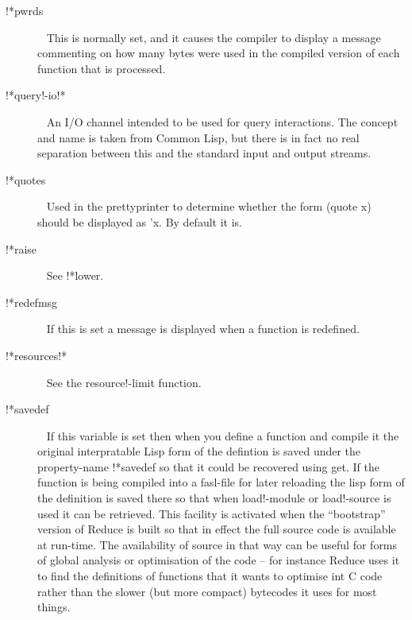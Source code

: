 \documentclass[a4paper,11pt]{article}
\begin{document}
\begin{description}
\item [{\ttfamily !*pwrds}]  ~\newline
This is normally set, and it causes the compiler to display a message
commenting on how many bytes were used in the compiled version of each
function that is processed.

\item [{\ttfamily !*query!-io!*}]  ~\newline
An I/O channel intended to be used for query interactions. The concept
and name is taken from Common Lisp, but there is in fact no real separation
between this and the standard input and output streams.

\item [{\ttfamily !*quotes}]  ~\newline
Used in the prettyprinter to determine whether the form {\ttfamily (quote x)}
should be displayed as {\ttfamily 'x}. By default it is.

\item [{\ttfamily !*raise}]  ~\newline
See {\ttfamily !*lower}.

\item [{\ttfamily !*redefmsg}]  ~\newline
If this is set a message is displayed when a function is redefined.

\item [{\ttfamily !*resources!*}]  ~\newline
See the {\ttfamily resource!-limit} function.

\item [{\ttfamily !*savedef}]  ~\newline
If this variable is set then when you define a function and compile it the
original interpratable Lisp form of the defintion is saved under the
property-name {\ttfamily !*savedef} so that it could be recovered using
{\ttfamily get}. If the function is being compiled into a fasl-file for
later reloading the lisp form of the definition is saved there so that when
{\ttfamily load!-module} or {\ttfamily load!-source} is used it can be
retrieved. This facility is activated when the ``bootstrap'' version of
Reduce is built so that in effect the full source code is available at
run-time. The availability of source in that way can be useful for forms
of global analysis or optimisation of the code -- for instance Reduce
uses it to find the definitions of functions that it wants to optimise
int C code rather than the slower (but more compact) bytecodes it uses
for most things.


\end{description}
\end{document}

